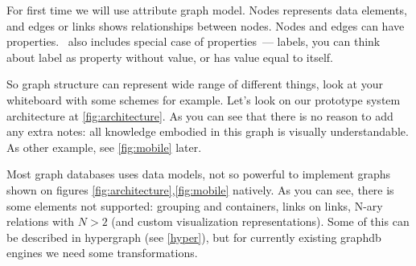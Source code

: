 \secdown

For first time we will use attribute graph model. Nodes represents data
elements, and edges or links shows relationships between nodes. Nodes and edges
can have properties. \neo\ also includes special case of properties\ --- labels,
you can think about label as property without value, or has value equal to
itself.

So graph structure can represent wide range of different things, look at your
whiteboard with some schemes for example. Let’s look on our prototype system
architecture at \autoref{fig:architecture}. As you can see that there is no
reason to add any extra notes: all knowledge embodied in this graph is visually
understandable. As other example, see \autoref{fig:mobile} later.


\clearpage

\secdown

Most graph databases uses data models, not so powerful to implement graphs shown
on figures \autoref{fig:architecture},\autoref{fig:mobile} natively. As you can
see, there is some elements not supported: grouping and containers, links on
links, N-ary relations with \mbox{$N>2$} (and custom visualization
representations). Some of this can be described in hypergraph (see
\autoref{hyper}), but for currently existing graphdb engines we need some
transformations.


\secup



\secup
